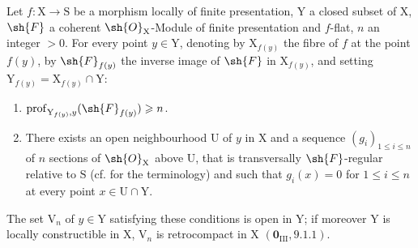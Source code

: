 \begin{proposition}[19.9.6]
\label{IV.19.9.6}
Let $f:\mathrm{X}\to\mathrm{S}$ be a morphism locally of finite presentation, $\mathrm{Y}$ a closed subset of $\mathrm{X}$, $\sh{F}$ a coherent $\sh{O}_\mathrm{X}$-Module of finite presentation and $f$-flat, $n$ an integer $>0$. For every point $y\in\mathrm{Y}$, denoting by $\mathrm{X}_{f(y)}$ the fibre of $f$ at the point $f(y)$, by $\sh{F}_{f(y)}$ the inverse image of $\sh{F}$ in $\mathrm{X}_{f(y)}$, and setting $\mathrm{Y}_{f(y)}=\mathrm{X}_{f(y)}\cap\mathrm{Y}$:
\begin{enumerate}
\item[\rm a)] $\operatorname{prof}_{\mathrm{Y}_{f(y)},y}(\sh{F}_{f(y)})\geqslant n$.
\item[\rm b)] There exists an open neighbourhood $\mathrm{U}$ of $y$ in $\mathrm{X}$ and a sequence $(g_i)_{1\leqslant i\leqslant n}$ of $n$ sections of $\sh{O}_\mathrm{X}$ above $\mathrm{U}$, that is transversally $\sh{F}$-regular relative to $\mathrm{S}$ (cf.  for the terminology) and such that $g_i(x)=0$ for $1\leqslant i\leqslant n$ at every point $x\in\mathrm{U}\cap\mathrm{Y}$.
\end{enumerate}

The set $\mathrm{V}_n$ of $y\in\mathrm{Y}$ satisfying these conditions is open in $\mathrm{Y}$; if moreover $\mathrm{Y}$ is locally constructible in $\mathrm{X}$, $\mathrm{V}_n$ is retrocompact in $\mathrm{X}$ $(\mathbf{0}_\mathrm{III},9.1.1)$.
\end{proposition}

